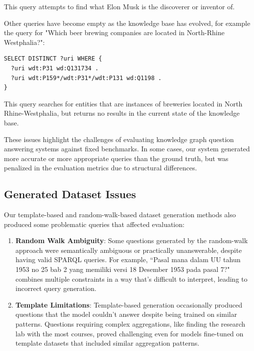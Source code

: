 \begin{enumerate}
This query attempts to find what Elon Musk is the discoverer or inventor of.

Other queries have become empty as the knowledge base has evolved, for example the query for "Which beer brewing companies are located in North-Rhine Westphalia?":

\begin{lstlisting}[language=SPARQL]
SELECT DISTINCT ?uri WHERE { 
  ?uri wdt:P31 wd:Q131734 . 
  ?uri wdt:P159*/wdt:P31*/wdt:P131 wd:Q1198 . 
}
\end{lstlisting}

This query searches for entities that are instances of breweries located in North Rhine-Westphalia, but returns no results in the current state of the knowledge base.
\end{enumerate}

These issues highlight the challenges of evaluating knowledge graph question answering systems against fixed benchmarks. In some cases, our system generated more accurate or more appropriate queries than the ground truth, but was penalized in the evaluation metrics due to structural differences.

\subsection{Generated Dataset Issues}
Our template-based and random-walk-based dataset generation methods also produced some problematic queries that affected evaluation:

\begin{enumerate}
    \item \textbf{Random Walk Ambiguity}: Some questions generated by the random-walk approach were semantically ambiguous or practically unanswerable, despite having valid SPARQL queries. For example, ``Pasal mana dalam UU tahun 1953 no 25 bab 2 yang memiliki versi 18 Desember 1953 pada pasal 7?" combines multiple constraints in a way that's difficult to interpret, leading to incorrect query generation.
    
    \item \textbf{Template Limitations}: Template-based generation occasionally produced questions that the model couldn't answer despite being trained on similar patterns. Questions requiring complex aggregations, like finding the research lab with the most courses, proved challenging even for models fine-tuned on template datasets that included similar aggregation patterns.
\end{enumerate}

